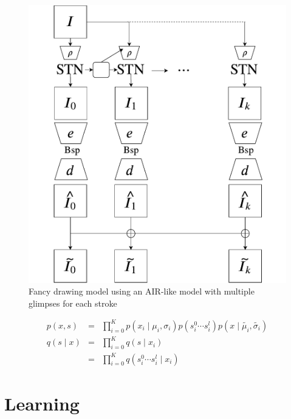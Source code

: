 \documentclass{article}
\newcommand{\given}{\mid}
\begin{document}
\begin{figure}[htb!]
\centering
\includegraphics[scale=0.35]{omnisynthfig2.pdf}
\caption{Fancy drawing model using an AIR-like model with multiple glimpses for each stroke}
\label{fig:fancymodel}
\end{figure}

\begin{eqnarray}
  p(x, s) &=& \prod_{i=0}^K p(x_i \given \mu_i, \sigma_i)p(s_i^0 \cdots s_i^l)p(x \given \tilde{\mu_i},\tilde{\sigma_i}) \\
  q(s \given x) &=& \prod_{i=0}^K q(s \given x_i) \\
                &=& \prod_{i=0}^K q(s_i^0 \cdots s_i^l \given x_i)
\end{eqnarray}

\section{Learning}

  
\end{document}
